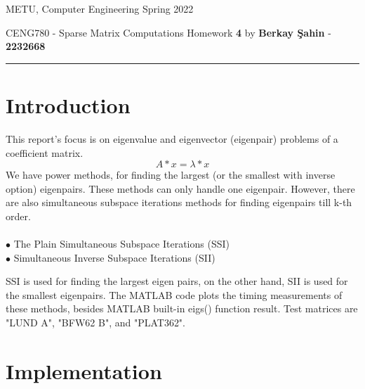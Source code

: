 \documentclass[12pt]{article}
\newcommand{\myheader}[4]
{\vspace*{-0.5in}
\noindent
{#1} \hfill {#3}

\noindent
{#2} \hfill {#4}

\noindent
\rule[8pt]{\textwidth}{1pt}

\vspace{1ex} 
}  %
\newcommand{\myalgsheader}[0]
{\myheader{METU, Computer Engineering}
{CENG780 - Sparse Matrix Computations Homework {\bf 4} by {\bf Berkay Şahin}  - \bf 2232668} {Spring 2022}{}}
\begin{document}
\myalgsheader
{}
\pagestyle{plain} 

\section{Introduction} 
\quad This report's focus is on eigenvalue and eigenvector (eigenpair) problems of a coefficient matrix. 
\[A*x = \lambda*x\] 
\quad We have power methods, for finding the largest (or the smallest with inverse option) eigenpairs. These methods can only handle one eigenpair. However, there are also simultaneous subspace iterations methods for finding eigenpairs till k-th order.\\ \\
$\bullet$ The Plain Simultaneous Subspace Iterations (SSI) \\ 
$\bullet$ Simultaneous Inverse Subspace Iterations (SII)\\ \par
SSI is used for finding the largest eigen pairs, on the other hand, SII is used for the smallest eigenpairs. The MATLAB code plots the timing measurements of these methods, besides MATLAB built-in eigs() function result. Test matrices are "LUND A", "BFW62 B", and "PLAT362".

\section{Implementation} 
\end{document}
